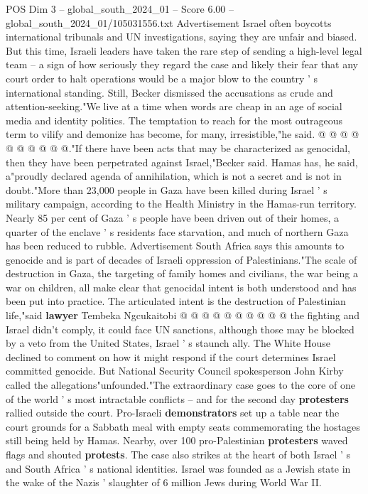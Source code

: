 \begin{textsample}{POS Dim 3 – global\_south\_2024\_01 – Score 6.00 – global\_south\_2024\_01/105031556.txt}
Advertisement Israel often boycotts international tribunals and UN investigations, saying they are unfair and biased.
But this time, Israeli leaders have taken the rare step of sending a high-level legal team -- a sign of how seriously they regard the case and likely their fear that any court order to halt operations would be a major blow to the country ' s international standing.
Still, Becker dismissed the accusations as crude and attention-seeking."We live at a time when words are cheap in an age of social media and identity politics.
The temptation to reach for the most outrageous term to vilify and demonize has become, for many, irresistible,"he said. @ @ @ @ @ @ @ @ @ @."If there have been acts that may be characterized as genocidal, then they have been perpetrated against Israel,"Becker said.
Hamas has, he said, a"proudly declared agenda of annihilation, which is not a secret and is not in doubt."More than 23,000 people in Gaza have been killed during Israel ' s military campaign, according to the Health Ministry in the Hamas-run territory.
Nearly 85 per cent of Gaza ' s people have been driven out of their homes, a quarter of the enclave ' s residents face starvation, and much of northern Gaza has been reduced to rubble.
Advertisement South Africa says this amounts to genocide and is part of decades of Israeli oppression of Palestinians."The scale of destruction in Gaza, the targeting of family homes and civilians, the war being a war on children, all make clear that genocidal intent is both understood and has been put into practice.
The articulated intent is the destruction of Palestinian life,"said \textbf{lawyer} Tembeka Ngcukaitobi @ @ @ @ @ @ @ @ @ @ the fighting and Israel didn't comply, it could face UN sanctions, although those may be blocked by a veto from the United States, Israel ' s staunch ally.
The White House declined to comment on how it might respond if the court determines Israel committed genocide.
But National Security Council spokesperson John Kirby called the allegations"unfounded."The extraordinary case goes to the core of one of the world ' s most intractable conflicts -- and for the second day \textbf{protesters} rallied outside the court.
Pro-Israeli \textbf{demonstrators} set up a table near the court grounds for a Sabbath meal with empty seats commemorating the hostages still being held by Hamas.
Nearby, over 100 pro-Palestinian \textbf{protesters} waved flags and shouted \textbf{protests}.
The case also strikes at the heart of both Israel ' s and South Africa ' s national identities.
Israel was founded as a Jewish state in the wake of the Nazis ' slaughter of 6 million Jews during World War II.

\end{textsample}
